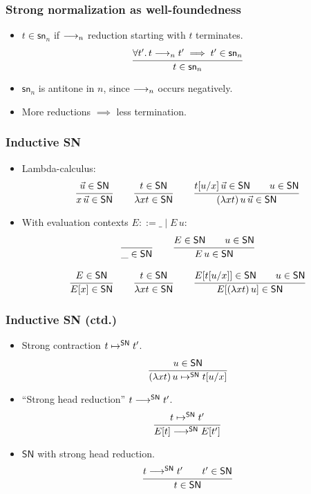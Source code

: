 \documentclass[t]{beamer}
\newcommand{\contrSN}{\contr^\SN}
\newcommand{\redSN}{\red^\SN}
\renewcommand{\sn}{\mathsf{sn}}
\renewcommand{\SN}{\mathsf{SN}}
\begin{document}
\begin{frame}%
  \frametitle{Strong normalization as well-foundedness}
  \begin{itemize}
  \item $t \in \sn_n$ if $\longrightarrow_n$ reduction starting with $t$
    terminates.
\[
  \ru{\forall t'.\, t \red_n t' \implies t' \in \sn_n
    }{t \in \sn_n}
\]
  \item $\sn_n$ is antitone in $n$, since $\longrightarrow_n$ occurs negatively.
  \item More reductions $\implies$ less termination.
  \end{itemize}
\end{frame}


\begin{frame}%
  \frametitle{Inductive SN}
  \begin{itemize}
  \item Lambda-calculus:
\[
  \ru{\vec u \in \SN
    }{x\,\vec u \in \SN}
\qquad
  \ru{t\in\SN}{\lambda x t \in \SN}
\qquad
  \ru{\subst u x t\, \vec u \in \SN \qquad u \in \SN
    }{(\lambda x t)\,u\,\vec u \in \SN}
\]
  \item With evaluation contexts $E ::= \_ \mid E\,u$:
\begin{gather*}
  \ru{}{\_ \in \SN}
\qquad
  \ru{E \in \SN \qquad u \in \SN}{E\,u \in \SN}
\\[2ex]
  \ru{E \in \SN
    }{E[x] \in \SN}
\qquad
  \ru{t\in\SN}{\lambda x t \in \SN}
\qquad
  \ru{E[\subst u x t] \in \SN \qquad u \in \SN
    }{E[(\lambda x t)\,u] \in \SN}
\end{gather*}
  \end{itemize}
\end{frame}

\begin{frame}%
  \frametitle{Inductive SN (ctd.)}
  \begin{itemize}
  \item Strong contraction $t \contrSN t'$.
\[
  \ru{u \in \SN
    }{(\lambda x t)\,u \contrSN \subst u x t}
\]
  \item ``Strong head reduction'' $t \redSN t'$.
\[
  \ru{t \contrSN t'}{E[t] \redSN E[t']}
\]
  \item $\SN$ with strong head reduction.
\[
  \ru{t \redSN t' \qquad t' \in \SN
    }{t \in \SN}
\]
  \end{itemize}
\end{frame}
\end{document}
